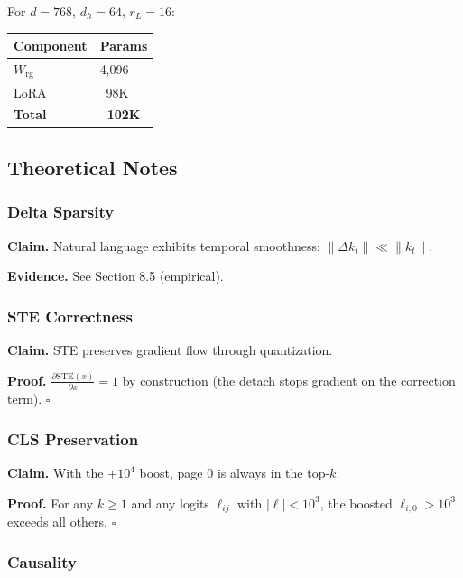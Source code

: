 For $d = 768$, $d_h = 64$, $r_L = 16$:

\begin{table}[H]
\centering
\small
\begin{tabular}{ll}
\toprule
\textbf{Component} & \textbf{Params} \\
\midrule
$W_\text{rg}$ & 4,096 \\
LoRA & ~98K \\
\textbf{Total} & \textbf{~102K} \\
\bottomrule
\end{tabular}
\end{table}

\subsection{Theoretical Notes}

\subsubsection{Delta Sparsity}

\textbf{Claim.} Natural language exhibits temporal smoothness: 
$\|\Delta k_t\| \ll \|k_t\|$.

\textbf{Evidence.} See Section 8.5 (empirical).

\subsubsection{STE Correctness}

\textbf{Claim.} STE preserves gradient flow through quantization.

\textbf{Proof.} $\frac{\partial \text{STE}(x)}{\partial x} = 1$ by construction 
(the detach stops gradient on the correction term). $\square$

\subsubsection{CLS Preservation}

\textbf{Claim.} With the $+10^4$ boost, page 0 is always in the top-$k$.

\textbf{Proof.} For any $k \geq 1$ and any logits $\ell_{ij}$ with $|\ell| < 10^3$, 
the boosted $\ell_{i, 0} > 10^3$ exceeds all others. $\square$

\subsubsection{Causality}

